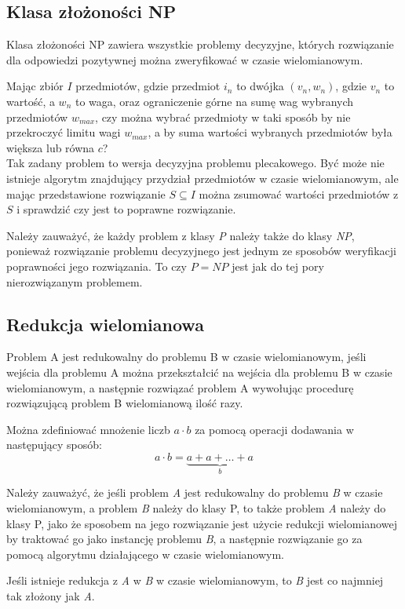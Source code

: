 \subsection{Klasa złożoności NP}
\begin{definition}
    Klasa złożoności NP zawiera wszystkie problemy decyzyjne, których rozwiązanie dla odpowiedzi pozytywnej
można zweryfikować w czasie wielomianowym.
\end{definition}
\begin{example}
    Mając zbiór $I$ przedmiotów, gdzie przedmiot $i_n$ to dwójka $(v_n, w_n)$, gdzie $v_n$ to wartość,
a $w_n$ to waga, oraz ograniczenie górne na sumę wag wybranych przedmiotów $w_{max}$, czy można
wybrać przedmioty w taki sposób by nie przekroczyć limitu wagi $w_{max}$, a by suma wartości
wybranych przedmiotów była większa lub równa $c$?\\
    Tak zadany problem to wersja decyzyjna problemu plecakowego. Być może nie istnieje algorytm znajdujący
przydział przedmiotów w czasie wielomianowym, ale mając przedstawione rozwiązanie $S \subseteq I$
można zsumować wartości przedmiotów z $S$ i sprawdzić czy jest to poprawne rozwiązanie.
\end{example}
    Należy zauważyć, że każdy problem z klasy \textit{P} należy także do klasy \textit{NP}, ponieważ
rozwiązanie problemu decyzyjnego jest jednym ze sposobów weryfikacji poprawności jego rozwiązania.
To czy $P = NP$ jest jak do tej pory nierozwiązanym problemem.

\subsection{Redukcja wielomianowa}
\begin{definition}
    Problem A jest redukowalny do problemu B w czasie wielomianowym, jeśli wejścia dla problemu A
można przekształcić na wejścia dla problemu B w czasie wielomianowym, a następnie rozwiązać problem A
wywołując procedurę rozwiązującą problem B wielomianową ilość razy.
\end{definition}
\begin{example}
    Można zdefiniować mnożenie liczb $a \cdot b$ za pomocą operacji dodawania w następujący sposób:
$$a \cdot b = \underbrace{a + a + \ldots + a}_{b}$$
\end{example}
    Należy zauważyć, że jeśli problem \textit{A} jest redukowalny do problemu \textit{B} w czasie wielomianowym,
a problem \textit{B} należy do klasy P, to także problem \textit{A} należy do klasy P, jako że
sposobem na jego rozwiązanie jest użycie redukcji wielomianowej by traktować go jako instancję problemu \textit{B},
a następnie rozwiązanie go za pomocą algorytmu działającego w czasie wielomianowym.
\begin{corollary}
    Jeśli istnieje redukcja z \textit{A} w \textit{B} w czasie wielomianowym, to \textit{B} jest
co najmniej tak złożony jak \textit{A}.
\end{corollary}

